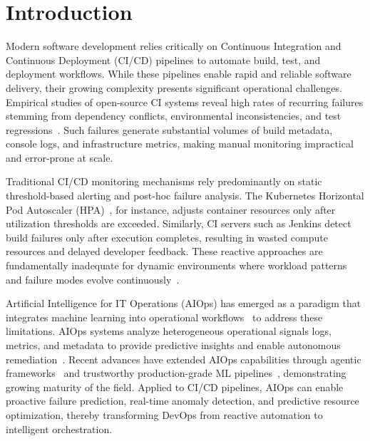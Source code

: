 \documentclass[sn-nature]{sn-jnl}
\theoremstyle{thmstyleone}
\theoremstyle{thmstyletwo}
\theoremstyle{thmstylethree}
\begin{document}
\section{Introduction}\label{sec:introduction}

Modern software development relies critically on Continuous Integration and Continuous Deployment (CI/CD) pipelines to automate build, test, and deployment workflows.
While these pipelines enable rapid and reliable software delivery, their growing complexity presents significant operational challenges.
Empirical studies of open-source CI systems reveal high rates of recurring failures stemming from dependency conflicts, environmental inconsistencies, and test regressions~\cite{rausch2017empirical, beller2017oops}.
Such failures generate substantial volumes of build metadata, console logs, and infrastructure metrics, making manual monitoring impractical and error-prone at scale.

Traditional CI/CD monitoring mechanisms rely predominantly on static threshold-based alerting and post-hoc failure analysis.
The Kubernetes Horizontal Pod Autoscaler (HPA)~\cite{kubernetesDocs}, for instance, adjusts container resources only after utilization thresholds are exceeded.
Similarly, CI servers such as Jenkins detect build failures only after execution completes, resulting in wasted compute resources and delayed developer feedback.
These reactive approaches are fundamentally inadequate for dynamic environments where workload patterns and failure modes evolve continuously~\cite{kanahols2025timeseries}.

Artificial Intelligence for IT Operations (AIOps) has emerged as a paradigm that integrates machine learning into operational workflows~\cite{dang2019aiops} to address these limitations.
AIOps systems analyze heterogeneous operational signals logs, metrics, and metadata to provide predictive insights and enable autonomous remediation~\cite{notaro2021aiops}.
Recent advances have extended AIOps capabilities through agentic frameworks~\cite{zota2025agentic} and trustworthy production-grade ML pipelines~\cite{bayram2025trustworthy}, demonstrating growing maturity of the field.
Applied to CI/CD pipelines, AIOps can enable proactive failure prediction, real-time anomaly detection, and predictive resource optimization, thereby transforming DevOps from reactive automation to intelligent orchestration.
\end{document}
